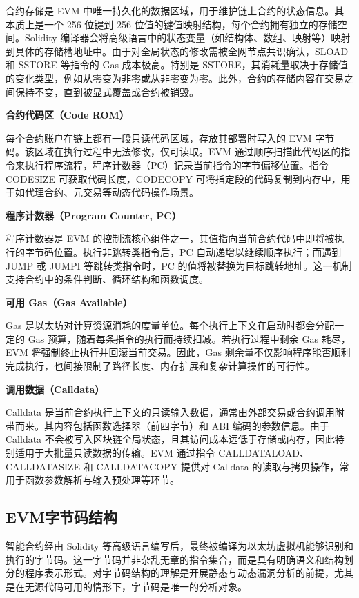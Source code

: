 \documentclass[print, master, vlined, timesmath]{DissertUESTC}
\begin{document}
合约存储是 EVM 中唯一持久化的数据区域，用于维护链上合约的状态信息。其本质上是一个 256 位键到 256 位值的键值映射结构，每个合约拥有独立的存储空间。Solidity 编译器会将高级语言中的状态变量（如结构体、数组、映射等）映射到具体的存储槽地址中。由于对全局状态的修改需被全网节点共识确认，SLOAD 和 SSTORE 等指令的 Gas 成本极高。特别是 SSTORE，其消耗量取决于存储值的变化类型，例如从零变为非零或从非零变为零。此外，合约的存储内容在交易之间保持不变，直到被显式覆盖或合约被销毁。

\textbf{合约代码区（Code ROM）}

每个合约账户在链上都有一段只读代码区域，存放其部署时写入的 EVM 字节码。该区域在执行过程中无法修改，仅可读取。EVM 通过顺序扫描此代码区的指令来执行程序流程，程序计数器（PC）记录当前指令的字节偏移位置。指令 CODESIZE 可获取代码长度，CODECOPY 可将指定段的代码复制到内存中，用于如代理合约、元交易等动态代码操作场景。

\textbf{程序计数器（Program Counter, PC）}

程序计数器是 EVM 的控制流核心组件之一，其值指向当前合约代码中即将被执行的字节码位置。执行非跳转类指令后，PC 自动递增以继续顺序执行；而遇到 JUMP 或 JUMPI 等跳转类指令时，PC 的值将被替换为目标跳转地址。这一机制支持合约中的条件判断、循环结构和函数调度。

\textbf{可用 Gas（Gas Available）}

Gas 是以太坊对计算资源消耗的度量单位。每个执行上下文在启动时都会分配一定的 Gas 预算，随着每条指令的执行而持续扣减。若执行过程中剩余 Gas 耗尽，EVM 将强制终止执行并回滚当前交易。因此，Gas 剩余量不仅影响程序能否顺利完成执行，也间接限制了路径长度、内存扩展和复杂计算操作的可行性。

\textbf{调用数据（Calldata）}

Calldata 是当前合约执行上下文的只读输入数据，通常由外部交易或合约调用附带而来。其内容包括函数选择器（前四字节）和 ABI 编码的参数信息。由于 Calldata 不会被写入区块链全局状态，且其访问成本远低于存储或内存，因此特别适用于大批量只读数据的传输。EVM 通过指令 CALLDATALOAD、CALLDATASIZE 和 CALLDATACOPY 提供对 Calldata 的读取与拷贝操作，常用于函数参数解析与输入预处理等环节。


\subsection{EVM字节码结构}

智能合约经由 Solidity 等高级语言编写后，最终被编译为以太坊虚拟机能够识别和执行的字节码。这一字节码并非杂乱无章的指令集合，而是具有明确语义和结构划分的程序表示形式。对字节码结构的理解是开展静态与动态漏洞分析的前提，尤其是在无源代码可用的情形下，字节码是唯一的分析对象。
\end{document}
